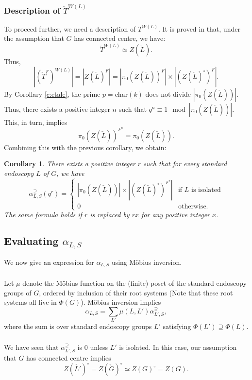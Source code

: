 \documentclass[12pt]{amsart}
\theoremstyle{plain}
\newtheorem{cor}[thm]{Corollary}
\theoremstyle{definition}
\theoremstyle{remark}
\newcommand{\chT}{\check{T}}
\begin{document}
\subsubsection{Description of $\check{T}^{W(L)}$} To proceed further, we need a description of $T^{W(L)}$. It is proved in \cite[\S 5]{KNP25} that, under the assumption that $G$ has connected centre, we have:
\[
\check{T}^{W(L)} \simeq Z(\check{L}). 
\]
Thus, 
\[
 |(\chT^F)^{W(L)}|=|Z(\check{L})^F|=|\pi_0(Z(\check{L}))^F|\times |(Z(\check{L})^\circ)^F|.
 \]
By Corollary \ref{c:etale}, the prime $p=\mathrm{char}(k)$ does not divide $|\pi_0(Z(\check{L}))|$. Thus, there exists a positive integer $n$ such that  $q^n\equiv 1 \mod |\pi_0(Z(\check{L}))|$. This, in turn, implies 
\[
\pi_0(Z(\check{L}))^{F^n}= \pi_0(Z(\check{L})).
\]
Combining this with the previous corollary, we obtain: 

\begin{cor} \label{c:r} 
There exists a positive integer $r$ such that for every standard endoscopy $L$ of $G$, we have 
\[
\alpha^{\supseteq}_{ L ,S}(q^r)= 
\begin{cases} |\pi_0(Z(\check{L}))|\times |(Z(\check{L})^\circ)^{F^r}|  & \textrm{if $L$ is isolated}\\
0 & \textrm{otherwise}. 
\end{cases} 
\]
The same formula holds if $r$ is replaced by $rx$ for any positive integer $x$. \end{cor} 
 


\subsection{Evaluating $\alpha_{L,S}$}\label{s:nu} We now give an expression for $\alpha_{L,S}$ using M\"{o}bius inversion. 

\subsubsection{} 
Let $\mu$ denote the M\"{o}bius function on the (finite) poset of the standard endoscopy groups of $G$, ordered by inclusion of their root systems (Note that these root systems all live in $\Phi(G)$). M\"{o}bius inversion implies 
\[
\alpha_{L,S} = \sum_{L'} \mu(L,L') \alpha^{\supseteq}_{L',S}, 
\]
where  the sum is over standard endoscopy groups $L'$ satisfying $\Phi(L')\supseteq \Phi(L)$.  
 \subsubsection{} We have seen that $\alpha_{L',S}^\supseteq$ is $0$ unless $L'$ is isolated. In this case, our assumption that $G$ has connected centre implies  
 \[
 Z(\check{L'})^\circ = Z(\check{G})^\circ \simeq Z(G)^\circ= Z(G). 
 \] 
\end{document}
